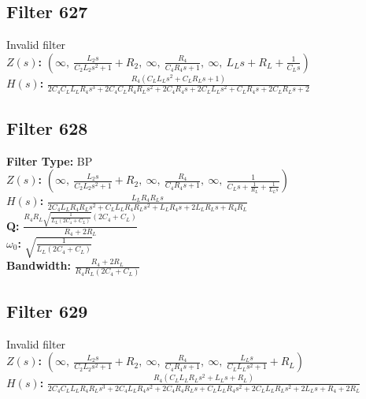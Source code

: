 \documentclass{article}
\begin{document}
\subsection*{Filter 627}
Invalid filter \\ 
\textbf{$Z(s)$:} $\left( \infty, \  \frac{L_{2} s}{C_{2} L_{2} s^{2} + 1} + R_{2}, \  \infty, \  \frac{R_{4}}{C_{4} R_{4} s + 1}, \  \infty, \  L_{L} s + R_{L} + \frac{1}{C_{L} s}\right)$ \\ 
\textbf{$H(s)$:} $\frac{R_{4} \left(C_{L} L_{L} s^{2} + C_{L} R_{L} s + 1\right)}{2 C_{4} C_{L} L_{L} R_{4} s^{3} + 2 C_{4} C_{L} R_{4} R_{L} s^{2} + 2 C_{4} R_{4} s + 2 C_{L} L_{L} s^{2} + C_{L} R_{4} s + 2 C_{L} R_{L} s + 2}$ \\ 
\subsection*{Filter 628}
\textbf{Filter Type:} BP \\ 
\textbf{$Z(s)$:} $\left( \infty, \  \frac{L_{2} s}{C_{2} L_{2} s^{2} + 1} + R_{2}, \  \infty, \  \frac{R_{4}}{C_{4} R_{4} s + 1}, \  \infty, \  \frac{1}{C_{L} s + \frac{1}{R_{L}} + \frac{1}{L_{L} s}}\right)$ \\ 
\textbf{$H(s)$:} $\frac{L_{L} R_{4} R_{L} s}{2 C_{4} L_{L} R_{4} R_{L} s^{2} + C_{L} L_{L} R_{4} R_{L} s^{2} + L_{L} R_{4} s + 2 L_{L} R_{L} s + R_{4} R_{L}}$ \\ 
\textbf{Q:} $\frac{R_{4} R_{L} \sqrt{\frac{1}{L_{L} \left(2 C_{4} + C_{L}\right)}} \left(2 C_{4} + C_{L}\right)}{R_{4} + 2 R_{L}}$ \\ 
\textbf{$\omega_0$:} $\sqrt{\frac{1}{L_{L} \left(2 C_{4} + C_{L}\right)}}$ \\ 
\textbf{Bandwidth:} $\frac{R_{4} + 2 R_{L}}{R_{4} R_{L} \left(2 C_{4} + C_{L}\right)}$ \\ 
\subsection*{Filter 629}
Invalid filter \\ 
\textbf{$Z(s)$:} $\left( \infty, \  \frac{L_{2} s}{C_{2} L_{2} s^{2} + 1} + R_{2}, \  \infty, \  \frac{R_{4}}{C_{4} R_{4} s + 1}, \  \infty, \  \frac{L_{L} s}{C_{L} L_{L} s^{2} + 1} + R_{L}\right)$ \\ 
\textbf{$H(s)$:} $\frac{R_{4} \left(C_{L} L_{L} R_{L} s^{2} + L_{L} s + R_{L}\right)}{2 C_{4} C_{L} L_{L} R_{4} R_{L} s^{3} + 2 C_{4} L_{L} R_{4} s^{2} + 2 C_{4} R_{4} R_{L} s + C_{L} L_{L} R_{4} s^{2} + 2 C_{L} L_{L} R_{L} s^{2} + 2 L_{L} s + R_{4} + 2 R_{L}}$ \\ 
\end{document}
